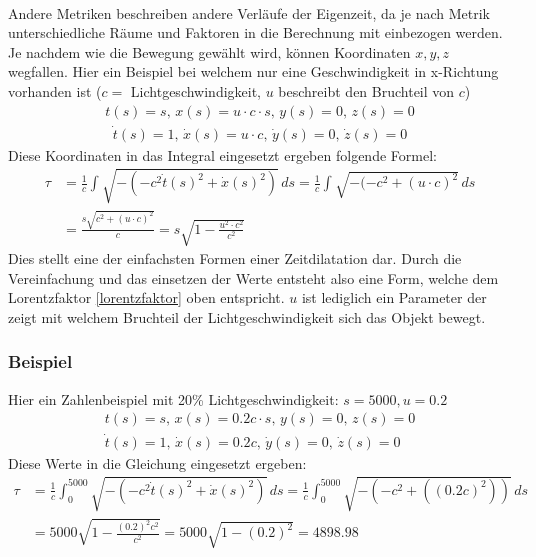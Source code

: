 \begin{refsection}
\begin{align*}
\end{align*}
Andere Metriken beschreiben andere Verläufe der Eigenzeit, da je nach Metrik unterschiedliche Räume und Faktoren in die Berechnung mit einbezogen werden. 
Je nachdem wie die Bewegung gew\"ahlt wird, können Koordinaten $x, y, z$ wegfallen.
Hier ein Beispiel bei welchem nur eine Geschwindigkeit in x-Richtung vorhanden ist ($c =$ Lichtgeschwindigkeit, $u$ beschreibt den Bruchteil von $c$)
\begin{align*}
     t(s)= s,\,
 	 x(s)=u\cdot c \cdot s,\,
     y(s)=0,\,
     z(s)=0 
\end{align*}
\begin{align*}
     \dot{t}(s)=1,\,
     \dot{x}(s)=u\cdot c,\,
     \dot{y}(s)=0,\,
     \dot{z}(s)=0
\end{align*}
Diese Koordinaten in das Integral eingesetzt ergeben folgende Formel:
\begin{align*}
\tau
&=
\frac{1}{c}\int_{}^{}\sqrt{-(-c^2\dot{t}(s)^2+\dot{x}(s)^2)}\,ds 
=
\frac{1}{c}\int_{}^{}\sqrt{-(-c^2 +(u\cdot c)^{2}}\,ds\\
&=
\frac{s\sqrt{c^2+(u\cdot c)^{2}}}{c} 
=
s\sqrt{1-\frac{u^2\cdot c^2}{c^2}}
\end{align*}
Dies stellt eine der einfachsten Formen einer Zeitdilatation dar. Durch die Vereinfachung und das einsetzen der Werte entsteht also eine Form, welche dem Lorentzfaktor \eqref{lorentzfaktor} oben entspricht.
$u$ ist lediglich ein Parameter der zeigt mit welchem Bruchteil der Lichtgeschwindigkeit sich das Objekt bewegt.

\subsubsection{Beispiel}

Hier ein Zahlenbeispiel mit 20\% Lichtgeschwindigkeit:
$s=5000, u=0.2$ 
\begin{align*}
    t(s)=s,\,
    x(s)=0.2c \cdot s,\,
    y(s)=0,\,
    z(s)=0 
    \\
    \dot{t}(s)=1,\,
    \dot{x}(s)=0.2c,\,
    \dot{y}(s)=0,\,
    \dot{z}(s)=0
\end{align*}
Diese Werte in die Gleichung eingesetzt ergeben:
\begin{align*}
 \tau
&=
\frac{1}{c}\int_{0}^{5000}\sqrt{-(-c^2\dot{t}(s)^2+\dot{x}(s)^2)}\,ds
=
\frac{1}{c}\int_{0}^{5000}\sqrt{-(-c^2+((0.2c)^2))}\,ds\\
&=
5000\sqrt{1-\frac{(0.2)^2 c^2}{c^2}} 
=
5000\sqrt{1-(0.2)^2}
=
4898.98
\end{align*}


\end{refsection}
